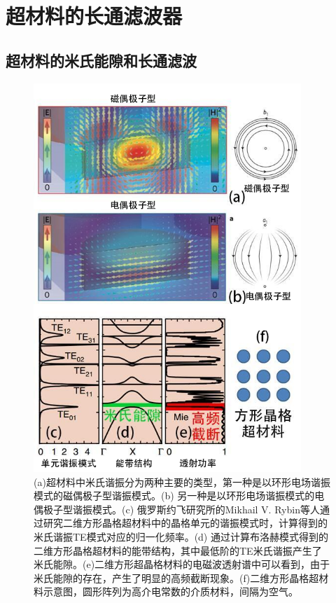 \chapter{超材料的长通滤波器}\label{chap:5}


\section{超材料的米氏能隙和长通滤波}

\begin{figure}[!htbp]
    \centering
    \includegraphics[width=0.9\textwidth]{Img/5-1.png}
    \caption{(a)超材料中米氏谐振分为两种主要的类型，第一种是以环形电场谐振模式的磁偶极子型谐振模式。(b) 另一种是以环形电场谐振模式的电偶极子型谐振模式。(c) 俄罗斯约飞研究所的Mikhail V. Rybin等人通过研究二维方形晶格超材料中的晶格单元的谐振模式时，计算得到的米氏谐振TE模式对应的归一化频率。(d) 通过计算布洛赫模式得到的二维方形晶格超材料的能带结构，其中最低阶的TE米氏谐振产生了米氏能隙。(e)二维方形超晶格材料的电磁波透射谱中可以看到，由于米氏能隙的存在，产生了明显的高频截断现象。(f)二维方形晶格超材料示意图，圆形阵列为高介电常数的介质材料，间隔为空气。\cite{Staude2017Metamaterial,Rybin2015Phase}}
    \label{fig:5-1}
\end{figure}

